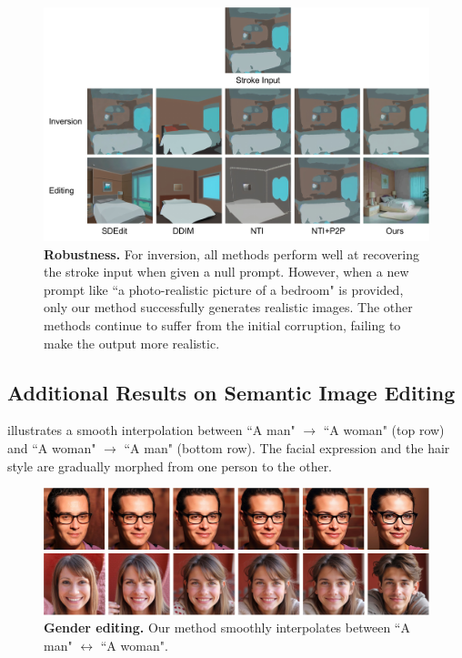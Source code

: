 \documentclass{article} %
\theoremstyle{plain}
\begin{document}
\begin{figure}[!tbh]
\includegraphics[width=0.8\linewidth]{pics/comp-inv-edit-stroke2img.pdf}
\caption{
\textbf{Robustness.} 
For inversion, all methods perform well at recovering the stroke input when given a null prompt. However, when a new prompt like ``a photo-realistic picture of a bedroom" is provided, only our method successfully generates realistic images. The other methods continue to suffer from the initial corruption, failing to make the output more realistic.
}
\label{fig:faith-edit}
\end{figure}


\subsection{Additional Results on Semantic Image Editing}
\label{sec:addn-exp-edit}

 illustrates a smooth interpolation between ``A man" $\rightarrow$ ``A woman" (top row) and ``A woman" $\rightarrow$ ``A man" (bottom row). The facial expression and the hair style are gradually morphed from one person to the other.

\begin{figure}[!tbh]
\includegraphics[width=\linewidth]{pics/gender-edit_low.pdf}
\caption{
\textbf{Gender editing.} 
Our method smoothly interpolates between ``A man" $\leftrightarrow$ ``A woman".
}
\label{fig:gender-edit}
\end{figure}
\end{document}
